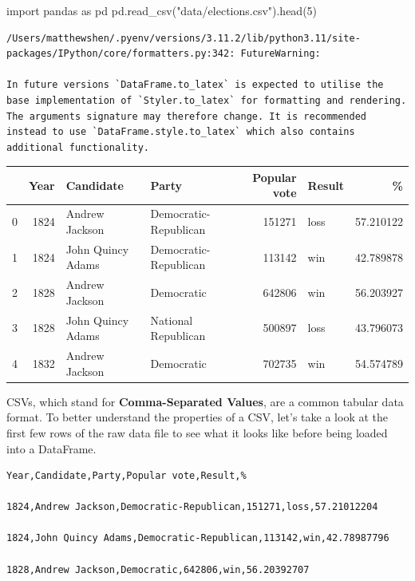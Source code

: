 \documentclass[
  letterpaper,
  DIV=11,
  numbers=noendperiod]{scrreprt}
\newenvironment{Shaded}{\begin{snugshade}}{\end{snugshade}}
\newcommand{\DecValTok}[1]{\textcolor[rgb]{0.68,0.00,0.00}{#1}}
\newcommand{\ImportTok}[1]{\textcolor[rgb]{0.00,0.46,0.62}{#1}}
\newcommand{\NormalTok}[1]{\textcolor[rgb]{0.00,0.23,0.31}{#1}}
\newcommand{\StringTok}[1]{\textcolor[rgb]{0.13,0.47,0.30}{#1}}
\begin{document}
\begin{Shaded}
\begin{Highlighting}[]
\ImportTok{import}\NormalTok{ pandas }\ImportTok{as}\NormalTok{ pd}
\NormalTok{pd.read\_csv(}\StringTok{"data/elections.csv"}\NormalTok{).head(}\DecValTok{5}\NormalTok{)}
\end{Highlighting}
\end{Shaded}

\begin{verbatim}
/Users/matthewshen/.pyenv/versions/3.11.2/lib/python3.11/site-packages/IPython/core/formatters.py:342: FutureWarning:

In future versions `DataFrame.to_latex` is expected to utilise the base implementation of `Styler.to_latex` for formatting and rendering. The arguments signature may therefore change. It is recommended instead to use `DataFrame.style.to_latex` which also contains additional functionality.
\end{verbatim}

\begin{tabular}{lrllrlr}
\toprule
{} &  Year &          Candidate &                  Party &  Popular vote & Result &          \% \\
\midrule
0 &  1824 &     Andrew Jackson &  Democratic-Republican &        151271 &   loss &  57.210122 \\
1 &  1824 &  John Quincy Adams &  Democratic-Republican &        113142 &    win &  42.789878 \\
2 &  1828 &     Andrew Jackson &             Democratic &        642806 &    win &  56.203927 \\
3 &  1828 &  John Quincy Adams &    National Republican &        500897 &   loss &  43.796073 \\
4 &  1832 &     Andrew Jackson &             Democratic &        702735 &    win &  54.574789 \\
\bottomrule
\end{tabular}

CSVs, which stand for \textbf{Comma-Separated Values}, are a common
tabular data format. To better understand the properties of a CSV, let's
take a look at the first few rows of the raw data file to see what it
looks like before being loaded into a DataFrame.

\begin{verbatim}
Year,Candidate,Party,Popular vote,Result,%

1824,Andrew Jackson,Democratic-Republican,151271,loss,57.21012204

1824,John Quincy Adams,Democratic-Republican,113142,win,42.78987796

1828,Andrew Jackson,Democratic,642806,win,56.20392707
\end{verbatim}
\end{document}
